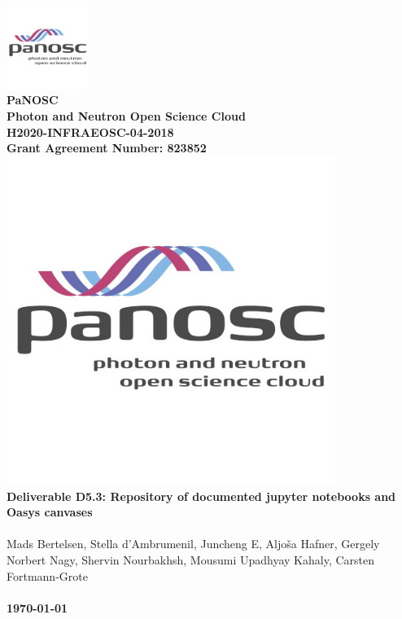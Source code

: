 \documentclass[10pt]{scrartcl}
\begin{document}
\makeatletter
\begin{titlepage}
\thispagestyle{scrheadings}
\ohead{}
\ihead{}
\chead{}
\ifoot{}
\ofoot{}
\noindent%
\includegraphics[width=0.2\textwidth]{figures/PaNOSClogo_web_RGB_512x512.jpg}\\
\Huge{%
\renewcommand{\baselinestretch}{2.0}%
  \textbf{%
  PaNOSC\\
Photon and Neutron Open Science Cloud\\
H2020-INFRAEOSC-04-2018 \\
Grant Agreement Number: 823852\\
\includegraphics[width=0.8\textwidth]{figures/PaNOSClogo_web_RGB_512x512.jpg}\\
    Deliverable D5.3: Repository of documented jupyter notebooks and Oasys canvases\\
  }%
}%
\\
{%
\Large{%
  Mads Bertelsen,
  Stella d'Ambrumenil,
  Juncheng E,
  Aljo\v{s}a Hafner,
  Gergely Norbert Nagy,
  Shervin Nourbakhsh,
  Mousumi Upadhyay Kahaly,
  Carsten Fortmann-Grote
  \bigskip\\
  \bigskip\\
  \textbf{\today}%
}}%
\end{titlepage}
\makeatother
\end{document}
